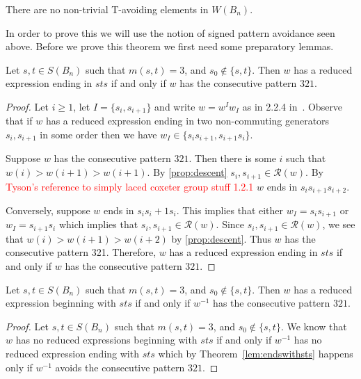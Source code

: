 \begin{theorem}\label{thm:classificationofB}
There are no non-trivial T-avoiding elements in $W(B_n)$.	
\end{theorem}
 
In order to prove this we will use the notion of signed pattern avoidance seen above. Before we prove this theorem we first need some preparatory lemmas. 

\begin{lemma}\label{lem:sts}
Let $s,t \in S(B_n)$ such that $m(s,t)=3$, and $s_0 \notin \{s,t\}.$ Then $w$ has a reduced expression ending in $sts$ if and only if $w$ has the consecutive pattern $321$.
\begin{proof}
	Let $i \geq 1$, let $I=\{s_i,s_{i+1}\}$ and write $w=w^Iw_I$ as in 2.2.4 in~\cite{Bjorner2005}. Observe that if $w$ has a reduced expression ending in two non-commuting generators $s_i, s_{i+1}$ in some order then we have $w_I \in \{s_is_{i+1}, s_{i+1}s_i\}$.
	
	Suppose $w$ has the consecutive pattern $321$. Then there is some $i$ such that $w(i) > w(i+1) > w(i+1)$. By \ref{prop:descent} $s_i,s_{i+1} \in \mathcal{R}(w)$. By \textcolor{red}{Tyson's reference to simply laced coxeter group stuff 1.2.1} $w$ ends in $s_is_{i+1}s_{i+2}$.
	
	Conversely, suppose $w$ ends in $s_is_i+1s_i$. This implies that either $w_I=s_is_{i+1}$ or $w_I=s_{i+1}s_i$ which implies that $s_i,s_{i+1} \in \mathcal{R}(w)$. Since $s_i,s_{i+1} \in \mathcal{R}(w)$, we see that $w(i)>w(i+1)>w(i+2)$ by \ref{prop:descent}. Thus $w$ has the consecutive pattern 321.
	Therefore, $w$ has a reduced expression ending in $sts$ if and only if $w$ has the consecutive pattern $321$. 
\end{proof}	
\end{lemma}

\begin{corollary}\label{lem:endswithsts}
	Let $s,t \in S(B_n)$ such that $m(s,t)=3$, and $s_0 \notin\{s,t\}$. Then $w$ has a reduced expression beginning with $sts$ if and only if $w^{-1}$ has the consecutive pattern $321$.
	\begin{proof}
		Let $s,t \in S(B_n)$ such that $m(s,t)=3$, and $s_0 \notin\{s,t\}$. We know that $w$ has no reduced expressions beginning with $sts$ if and only if $w^{-1}$ has no reduced expression ending with $sts$ which by Theorem~\ref{lem:endswithsts} happens only if $w^{-1}$ avoids the consecutive pattern $321$.
	\end{proof}
\end{corollary}

